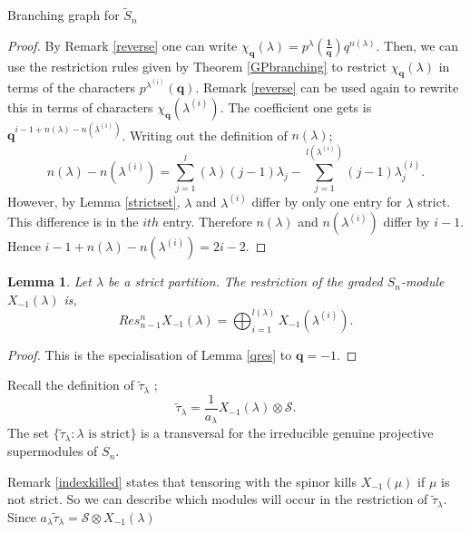 \documentclass[a4paper,10pt]{amsart}
\newtheorem{lemma}[theorem]{Lemma}
\begin{document}
\begin{section}{Branching graph for $\tilde{S}_n$}
\begin{proof} By Remark \ref{reverse} one can write $\chi_\textbf{q}(\lambda) = p^\lambda (\boldsymbol{\frac{1}{q}}) q^{n(\lambda)}$. Then, we can use the restriction rules given by Theorem \ref{GPbranching} to restrict $\chi_\textbf{q}(\lambda)$ in terms of the characters $p^{\lambda^{(i)}}(\textbf{q})$. Remark \ref{reverse} can be used again to rewrite this in terms of characters $\chi_{\textbf{q}}(\lambda^{(i)})$. The coefficient one gets is  $\textbf{q}^{i-1+ n(\lambda) - n(\lambda^{(i)})}$. Writing out the definition of $n(\lambda)$; 
$$n(\lambda) - n(\lambda^{(i)}) = \sum_{j=1}^l(\lambda)(j-1)\lambda_j - \sum_{j=1}^{l(\lambda^{(i)})} (j-1)\lambda^{(i)}_j.$$ However, by Lemma \ref{strictset}, $\lambda$ and $\lambda^{(i)}$ differ by only one entry for $\lambda$ strict. This difference is in the $ith$ entry. Therefore $n(\lambda)$ and $n(\lambda^{(i)})$ differ by $i-1$. Hence $i-1+ n(\lambda) - n(\lambda^{(i)}) = 2i-2$.  \end{proof}



\begin{lemma}\label{summands} Let $\lambda$ be a strict partition. The restriction of the graded $S_n$-module $X_{-1}(\lambda)$ is,
$$Res^{n}_{n-1} X_{-1}(\lambda) = \bigoplus_{i=1}^{l(\lambda)} X_{-1}(\lambda^{(i)}).$$ \end{lemma} 
\begin{proof} This is the specialisation of Lemma \ref{qres} to $\textbf{q} = -1$. \end{proof}
Recall the definition of $\tilde{\tau}_\lambda$ \cite[A.3]{BCT12}; $$\tilde{\tau}_\lambda = \frac{1}{a_\lambda} X_{-1}(\lambda) \otimes \mathcal{S}.$$ The set $\{\tilde{\tau}_\lambda : \lambda \text{ is strict}\}$ is a transversal for the irreducible genuine projective supermodules of $S_n$.

Remark \ref{indexkilled} states that tensoring with the spinor kills $X_{-1}(\mu)$ if $\mu$ is not strict. So we can describe which modules will occur in the restriction of $\tilde{\tau}_\lambda$. Since $a_\lambda\tilde{\tau}_\lambda =\mathcal{S}\otimes X_{-1}(\lambda)$


\end{section}
\end{document}
